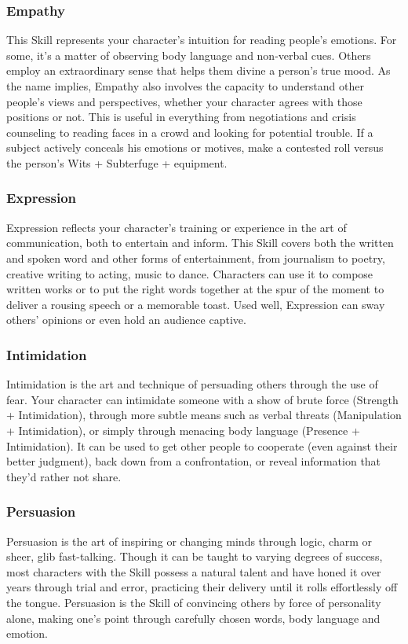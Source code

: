 \documentclass["../Misguided by Starlight.tex"]{subfiles}
\begin{document}
\subsubsection{Empathy}
This Skill represents your character’s intuition for reading people’s emotions. For some, it’s a matter of observing body language and non-verbal cues. Others employ an extraordinary sense that helps them divine a person’s true mood. As the name implies, Empathy also involves the capacity to understand other people’s views and perspectives, whether your character agrees with those positions or not. This is useful in everything from negotiations and crisis counseling to reading faces in a crowd and looking for potential trouble. If a subject actively conceals his emotions or motives, make a contested roll versus the person’s Wits + Subterfuge + equipment.

\subsubsection{Expression}
Expression reflects your character’s training or experience in the art of communication, both to entertain and inform. This Skill covers both the written and spoken word and other forms of entertainment, from journalism to poetry, creative writing to acting, music to dance. Characters can use it to compose written works or to put the right words together at the spur of the moment to deliver a rousing speech or a memorable toast. Used well, Expression can sway others’ opinions or even hold an audience captive.

\subsubsection{Intimidation}
Intimidation is the art and technique of persuading others through the use of fear. Your character can intimidate someone with a show of brute force (Strength + Intimidation), through more subtle means such as verbal threats (Manipulation + Intimidation), or simply through menacing body language (Presence + Intimidation). It can be used to get other people to cooperate (even against their better judgment), back down from a confrontation, or reveal information that they’d rather not share.

\subsubsection{Persuasion}
Persuasion is the art of inspiring or changing minds through logic, charm or sheer, glib fast-talking. Though it can be taught to varying degrees of success, most characters with the Skill possess a natural talent and have honed it over years through trial and error, practicing their delivery until it rolls effortlessly off the tongue. Persuasion is the Skill of convincing others by force of personality alone, making one’s point through carefully chosen words, body language and emotion.
\end{document}
